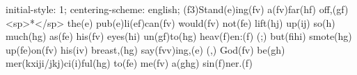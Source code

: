 initial-style: 1;
centering-scheme: english;
(f3)Stand(e)ing(fv) a(fv)far(hf) off,(gf) <sp>*</sp> the(e) pub(e)li(ef)can(fv) would(fv) not(fe) lift(hj) up(ij) so(h) much(hg) as(fe) his(fv) eyes(hi) un(gf)to(hg) heav(f)en:(f) (;) but(fihi) smote(hg) up(fe)on(fv) his(iv) breast,(hg) say(fvv)ing,(e) (,) God(fv) be(gh) mer(kxiji/jkj)ci(i)ful(hg) to(fe) me(fv) a(ghg) sin(f)ner.(f)
